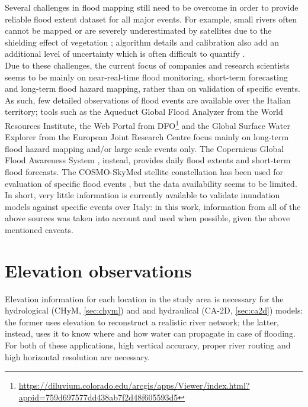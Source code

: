 Several challenges in flood mapping still need to be overcome in order to provide reliable flood extent dataset for all major events. For example, small rivers often cannot be mapped or are severely underestimated by satellites due to the shielding effect of vegetation \citep{SMITH1997}; algorithm details and calibration also add an additional level of uncertainty which is often difficult to quantify \citep{Stephens2012}.\\
Due to these challenges, the current focus of companies and research scientists seems to be mainly on near-real-time flood monitoring, short-term forecasting and long-term flood hazard mapping, rather than on validation of specific events. As such, few detailed observations of flood events are available over the Italian territory; tools such as the Aqueduct Global Flood Analyzer \citep{Luo2015} from the World Resources Institute, the Web Portal from DFO\footnote{\url{https://diluvium.colorado.edu/arcgis/apps/Viewer/index.html?appid=759d697577dd438ab7f2d48f605593d5}} and the Global Surface Water Explorer \citep{Pekel2016} from the European Joint Research Centre focus mainly on long-term flood hazard mapping and/or large scale events only.
The Copernicus Global Flood Awareness System \citep[GLOFAS][]{Alfieri2013}, instead, provides daily flood extents and short-term flood forecasts. The COSMO-SkyMed stellite constellation \citep{Covello2010} has been used for evaluation of specific flood events \citep[see e.g.][]{Refice2014, Pierdicca2013, Pulvirenti2011}, but the data availability seems to be limited. In short, very little information is currently available to validate inundation models against specific events over Italy: in this work, information from all of the above sources was taken into account and used when possible, given the above mentioned caveats.


\section{Elevation observations} \label{sec:DEM}
Elevation information for each location in the study area is necessary for the hydrological (CHyM, \cref{sec:chym}) and and hydraulical (CA-2D, \cref{sec:ca2d}) models: the former uses elevation to reconstruct a realistic river network; the latter, instead, uses it to know where and how water can propagate in case of flooding. For both of these applications, high vertical accuracy, proper river routing and high horizontal resolution are necessary.


